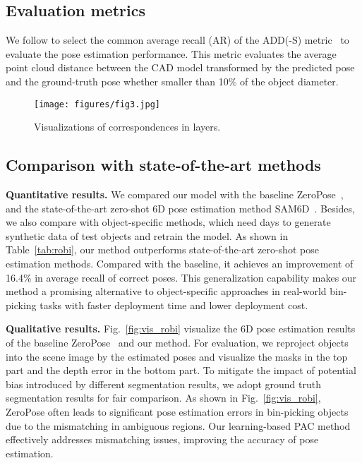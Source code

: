 % 
\subsection{Evaluation metrics} 
We follow \cite{st6deccv, MVBPICRA, dcnet} to select the common average recall (AR) of the ADD(-S) metric~\cite{add} to evaluate the pose estimation performance. This metric evaluates the average point cloud distance between the CAD model transformed by the predicted pose and the ground-truth pose whether smaller than 10\% of the object diameter. 


\begin{figure}[t!]
    \centering
    \texttt{[image: figures/fig3.jpg]}
    \caption{Visualizations of correspondences in layers.}
    \label{fig:vis_layers}
    \vspace{-3mm}
\end{figure}

\subsection{Comparison with state-of-the-art methods}
\noindent\textbf{Quantitative results.}
We compared our model with the baseline ZeroPose~\cite{chen2023zeropose}, and the state-of-the-art zero-shot 6D pose estimation method SAM6D~\cite{sam6d}.
Besides, we also compare with object-specific methods, which need days to generate synthetic data of test objects and retrain the model.
As shown in Table~\ref{tab:robi}, our method outperforms state-of-the-art zero-shot pose estimation methods. Compared with the baseline, it achieves an improvement of 16.4\% in average recall of correct poses.
 This generalization capability makes our method a promising alternative to object-specific approaches in real-world bin-picking tasks with faster deployment time and lower deployment cost.

\vspace{1mm}
\noindent\textbf{Qualitative results.}
Fig.~\ref{fig:vis_robi} visualize the 6D pose estimation results of the baseline ZeroPose~\cite{chen2023zeropose} and our method.
For evaluation, we reproject objects into the scene image by the estimated poses and visualize the masks in the top part and the depth error in the bottom part.
To mitigate the impact of potential bias introduced by different segmentation results, we adopt ground truth segmentation results for fair comparison.
As shown in Fig.~\ref{fig:vis_robi}, ZeroPose often leads to significant pose estimation errors in bin-picking objects due to the mismatching in ambiguous regions. Our learning-based PAC method effectively addresses mismatching issues, improving the accuracy of pose estimation.




